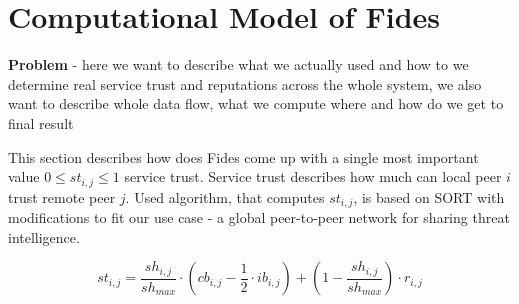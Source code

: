 \section{Computational Model of Fides}
\label{sec:computational-model}
\textbf{Problem} - here we want to describe what we actually used and how to we determine real service trust and reputations across  the whole system, we also want to describe whole data flow, what we compute where and how do we get to final result

\vspace{10mm}

This section describes how does Fides come up with a single most important value $0 \leq st_{i,j} \leq 1$ service trust. Service trust describes how much can local peer $i$ trust remote peer $j$.
Used algorithm, that computes $st_{i,j}$, is based on SORT\cite{sort} with modifications to fit our use case - a global peer-to-peer network for sharing threat intelligence.

\begin{equation}
st_{i,j}=\frac{sh_{i,j}}{sh_{max}} \cdot \left(cb_{i,j} - \frac{1}{2} \cdot ib_{i,j} \right) +\left(1-\frac{sh_{i,j}}{sh_{max}}\right) \cdot r_{i,j}
\end{equation}